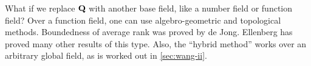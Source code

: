 What if we replace $\mathbf{Q}$ with another base field, like a number field or 
function field? Over a function field, one can use algebro-geometric and 
topological methods. Boundedness of average rank was proved by de Jong. 
Ellenberg has proved many other results of this type. Also, the ``hybrid 
method'' works over an arbitrary global field, as is worked out in 
\autoref{sec:wang-ii}. 





